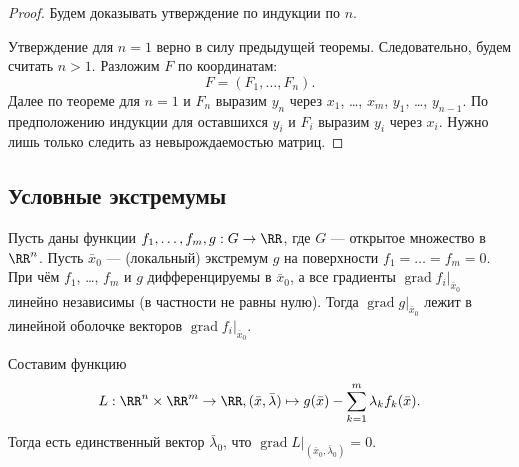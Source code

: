 \documentclass[12pt,a4paper]{article}
\DeclareMathOperator{\grad}{grad}
\begin{document}
    \begin{proof}
        Будем доказывать утверждение по индукции по $n$.

        Утверждение для $n=1$ верно в силу предыдущей теоремы. Следовательно, будем считать $n > 1$. Разложим $F$ по координатам:
        \[F = (F_1, \dots, F_n).\] Далее по теореме для $n=1$ и $F_n$ выразим $y_n$ через $x_1$, \dots, $x_m$, $y_1$, \dots, $y_{n-1}$. По предположению индукции для оставшихся $y_i$ и $F_i$ выразим $y_i$ через $x_i$. Нужно лишь только следить аз невырождаемостью матриц.

    \end{proof}

    \subsection{Условные экстремумы}

    \begin{theorem}
        Пусть даны функции $f_1, \dots, f_m, g: G \to \RR$, где $G$ --- открытое множество в $\RR^n$. Пусть $\bar{x}_0$ --- (локальный) экстремум $g$ на поверхности $f_1 = \dots = f_m = 0$. При чём $f_1$, \dots, $f_m$ и $g$ дифференцируемы в $\bar{x}_0$, а все градиенты $\grad f_i|_{\bar{x}_0}$ линейно независимы (в частности не равны нулю). Тогда $\grad g|_{\bar{x}_0}$ лежит в линейной оболочке векторов $\grad f_i|_{\bar{x}_0}$.
    \end{theorem}
    
    
    \begin{corollary}
        Составим функцию
        \[L: \RR^n \times \RR^m \to \RR, (\bar{x}, \bar{\lambda}) \mapsto g(\bar{x}) - \sum_{k=1}^m \lambda_k f_k(\bar{x}).\]
        Тогда есть единственный вектор $\bar{\lambda}_0$, что $\grad L|_{(\bar{x}_0, \bar{\lambda}_0)} = 0$.
    \end{corollary}
\end{document}
